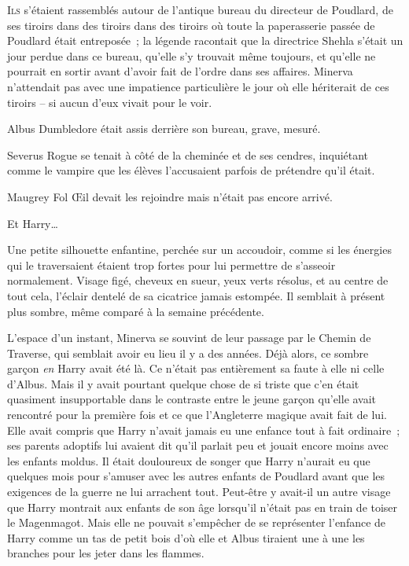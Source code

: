 \lettrine{I}{ls} s'étaient rassemblés autour de l'antique bureau du directeur de Poudlard, de ses tiroirs dans des tiroirs dans des tiroirs où toute la paperasserie passée de Poudlard était entreposée~; la légende racontait que la directrice Shehla s'était un jour perdue dans ce bureau, qu'elle s'y trouvait même toujours, et qu'elle ne pourrait en sortir avant d'avoir fait de l'ordre dans ses affaires. Minerva n'attendait pas avec une impatience particulière le jour où elle hériterait de ces tiroirs -- si aucun d'eux vivait pour le voir.

Albus Dumbledore était assis derrière son bureau, grave, mesuré.

Severus Rogue se tenait à côté de la cheminée et de ses cendres, inquiétant comme le vampire que les élèves l'accusaient parfois de prétendre qu'il était.

Maugrey Fol Œil devait les rejoindre mais n'était pas encore arrivé.

Et Harry…

Une petite silhouette enfantine, perchée sur un accoudoir, comme si les énergies qui le traversaient étaient trop fortes pour lui permettre de s'asseoir normalement. Visage figé, cheveux en sueur, yeux verts résolus, et au centre de tout cela, l'éclair dentelé de sa cicatrice jamais estompée. Il semblait à présent plus sombre, même comparé à la semaine précédente.

L'espace d'un instant, Minerva se souvint de leur passage par le Chemin de Traverse, qui semblait avoir eu lieu il y a des années. Déjà alors, ce sombre garçon \emph{en} Harry avait été là. Ce n'était pas entièrement sa faute à elle ni celle d'Albus. Mais il y avait pourtant quelque chose de si triste que c'en était quasiment insupportable dans le contraste entre le jeune garçon qu'elle avait rencontré pour la première fois et ce que l'Angleterre magique avait fait de lui. Elle avait compris que Harry n'avait jamais eu une enfance tout à fait ordinaire~; ses parents adoptifs lui avaient dit qu'il parlait peu et jouait encore moins avec les enfants moldus. Il était douloureux de songer que Harry n'aurait eu que quelques mois pour s'amuser avec les autres enfants de Poudlard avant que les exigences de la guerre ne lui arrachent tout. Peut-être y avait-il un autre visage que Harry montrait aux enfants de son âge lorsqu'il n'était pas en train de toiser le Magenmagot. Mais elle ne pouvait s'empêcher de se représenter l'enfance de Harry comme un tas de petit bois d'où elle et Albus tiraient une à une les branches pour les jeter dans les flammes.

